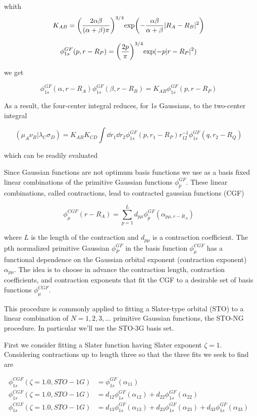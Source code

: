 \documentclass[11pt]{article}
\begin{document}
whith
\[ K_{AB} = \qty(\frac{2\alpha\beta}{(\alpha+\beta)\pi})^{3/4} \text{exp}\qty(-\frac{\alpha\beta}{\alpha+\beta}|R_A-R_B|^2) \]

\[ \phi_{1s}^{GF}(p,r-R_P) = \qty(\frac{2p}{\pi})^{3/4} \text{exp}(-p|r-R_P|^2) \]

we get

\[ \phi_{1s}^{GF}(\alpha,r-R_A)\phi_{1s}^{GF}(\beta,r-R_B)= K_{AB} \phi_{1s}^{GF}(p,r-R_P) \]

As a result, the four-center integral reduces, for 1s Gaussians, to the two-center integral

\[ (\mu_A\nu_B|\lambda_C\sigma_D) = K_{AB}K_{CD} \int \dd{r_1}\dd{r_2} \phi_{1s}^{GF}(p,r_1-R_P)r_{12}^{-1}\phi_{1s}^{GF}(q,r_2-R_Q) \]

which can be readily evaluated

Since Gaussian functions are not optimum basis functions we use as a basis fixed linear combinations of the primitive Gaussian functions \(\phi_p^{GF}\). These linear combinations, called contractions, lead to contracted gaussian functions (CGF)

\[ \phi_{\mu}^{CGF}(r-R_A) = \sum_{p=1}^L d_{p\mu}\phi_p^{GF}(\alpha_{p\mu, r-R_A}) \]

where \(L\) is the length of the contraction and \(d_{p\mu}\) is a contraction coefficient. The pth normalized primitive Gaussian \(\phi_P^{GF}\) in the basis function \(\phi_{\mu}^{CGF}\) has a functional dependence on the Gaussian orbital exponent (contraction exponent) \(\alpha_{p\mu}\). The idea is to choose in advance the contraction length, contraction coefficients, and contraction exponents that fit the CGF to a desirable set of basis functions \(\phi_{\mu}^{CGF}\).

This procedure is commonly applied to fitting a Slater-type orbital (STO) to a linear combination of \(N = 1,2,3,...\) primitive Gaussian functions, the STO-NG procedure. In particular we'll use the STO-3G basis set.

First we consider fitting a Slater function having Slater exponent \(\zeta = 1\). Considering contractions up to length three so that the three fits we seek to find are

\begin{align*}
    \phi_{1s}^{CGF}(\zeta=1.0, STO-1G) &= \phi_{1s}^{GF}(\alpha_{11}) \\
    \phi_{1s}^{CGF}(\zeta=1.0, STO-1G) &= d_{12}\phi_{1s}^{GF}(\alpha_{12}) + d_{22} \phi_{1s}^{GF}(\alpha_{22}) \\
    \phi_{1s}^{CGF}(\zeta=1.0, STO-1G) &= d_{13}\phi_{1s}^{GF}(\alpha_{13}) + d_{23} \phi_{1s}^{GF}(\alpha_{23}) + d_{33}\phi_{1s}^{GF}(\alpha_{33})
\end{align*}
\end{document}
